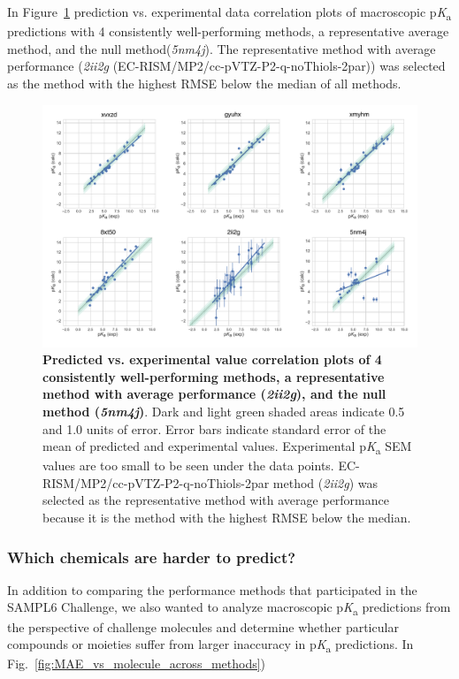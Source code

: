 \documentclass[9pt,lineno,final]{elife}
\newcommand{\pKa}{p\textit{K}\textsubscript{a}}
\begin{document}
In Figure~\ref{fig:typeIII_pred_vs_exp_correlation} prediction vs. experimental data correlation plots of macroscopic \pKa{} predictions with 4 consistently well-performing methods, a representative average method, and the null method(\textit{5nm4j}). The representative method with average performance (\textit{2ii2g} (EC-RISM/MP2/cc-pVTZ-P2-q-noThiols-2par)) was selected as the method with the highest RMSE below the median of all methods.

\begin{figure}[h]
\centering
\includegraphics[width=1.0\linewidth]{figures/typeIII-pred-vs-exp-correlation-fig.pdf}
\caption{{\bf Predicted vs. experimental value correlation plots of 4 consistently well-performing methods, a representative method with average performance (\textit{2ii2g}), and the null method (\textit{5nm4j})}. 
Dark and light green shaded areas indicate 0.5 and 1.0 units of error. Error bars indicate standard error of the mean of predicted and experimental values. Experimental \pKa{} SEM values are too small to be seen under the data points. EC-RISM/MP2/cc-pVTZ-P2-q-noThiols-2par method (\textit{2ii2g}) was selected as the representative method with average performance because it is the method with the highest RMSE below the median.
}
\label{fig:typeIII_pred_vs_exp_correlation}
\end{figure}



\subsubsection{Which chemicals are harder to predict?}

In addition to comparing the performance methods that participated in the SAMPL6 Challenge, we also wanted to analyze macroscopic \pKa{} predictions from the perspective of challenge molecules and determine whether particular compounds or moieties suffer from larger inaccuracy in \pKa{} predictions. In Fig.~\ref{fig:MAE_vs_molecule_across_methods})
\end{document}
